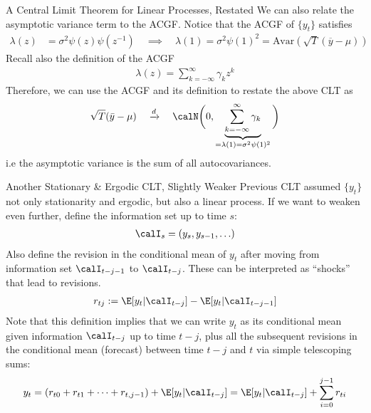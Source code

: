 \documentclass[aspectratio=169, handout]{beamer}
\newcommand{\dto}{\xrightarrow{d}}
\begin{document}
{\footnotesize
\begin{frame}{A Central Limit Theorem for Linear Processes, Restated}
We can also relate the asymptotic variance term to the ACGF.
Notice that the ACGF of $\{y_t\}$ satisfies
\begin{align*}
  \lambda(z)
  &= \sigma^2 \psi(z) \psi(z^{-1})
  \quad\implies\quad
  \lambda(1)
  =
  \sigma^2\psi(1)^2
  =
  \text{Avar}(\sqrt{T}(\overline{y}-\mu))
\end{align*}
\pause
Recall also the definition of the ACGF
\begin{align*}
  \lambda(z)
  =
  \sum_{k=-\infty}^\infty \gamma_k z^k
\end{align*}
\pause
Therefore, we can use the ACGF and its definition to restate the above
CLT as
\begin{align*}
  \sqrt{T}(\bar{y}-\mu)
  \quad\dto\quad
  \calN\bigg(
    0,
    \underbrace{%
    \sum_{k=-\infty}^\infty \gamma_k
    }_{=\lambda(1)=\sigma^2\psi(1)^2}
  \bigg)
\end{align*}
i.e the asymptotic variance is the sum of all autocovariances.
\end{frame}
}


{\scriptsize
\begin{frame}{Another Stationary \& Ergodic CLT, Slightly Weaker}
Previous CLT assumed $\{y_t\}$ not only stationarity and
ergodic, but also a \alert{linear process}.
If we want to weaken even further,
define the information set up to time $s$:
\begin{align*}
  \calI_s=(y_s,y_{s-1},\ldots)
\end{align*}
Also define the \alert{revision} in the conditional mean of $y_t$ after
moving from information set $\calI_{t-j-1}$ to $\calI_{t-j}$.
These can be interpreted as ``shocks'' that lead to revisions.
\begin{align*}
  r_{tj} := \E[y_t|\calI_{t-j}] - \E[y_t|\calI_{t-j-1}]
\end{align*}
Note that this definition implies that we can write
$y_t$ as its conditional mean given information $\calI_{t-j}$ up to time
$t-j$, plus all the subsequent revisions in the conditional mean
(forecast) between time $t-j$ and $t$ via simple telescoping sums:
\begin{align*}
  y_t =
  (r_{t0} + r_{t1} + \cdots + r_{t,j-1})
  +
  \E[y_t|\calI_{t-j}]
  =
  \E[y_t|\calI_{t-j}]
  +
  \sum_{i=0}^{j-1}
  r_{ti}
\end{align*}
\end{frame}
}
\end{document}
